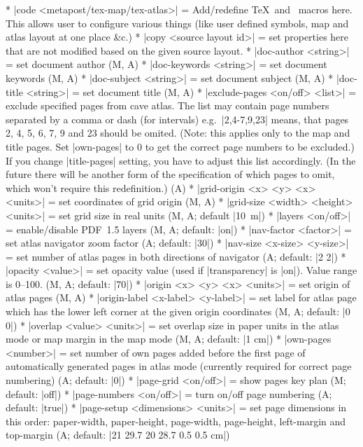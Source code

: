 \comopt 
  * |code <metapost/tex-map/tex-atlas>| = Add/redefine \TeX\ and \MP\
    macros here. This allows user to configure various things 
    (like user defined symbols, map and atlas layout at one place \&c.)
  * |copy <source layout id>| = set properties here that are not
    modified based on the given source layout.
  * |doc-author <string>| = set document author (M, A)
  * |doc-keywords <string>| = set document keywords (M, A)
  * |doc-subject <string>| = set document subject (M, A)
  * |doc-title <string>| = set document title (M, A)
  * |exclude-pages <on/off> <list>| = exclude specified pages from cave
    atlas. The list may contain page numbers separated by a comma or dash (for intervals) 
    e.g.~|2,4-7,9,23| means, that pages 2, 4, 5, 6, 7, 9 and 23 should be 
    omited. (Note: this applies only to the map and title pages. Set 
    |own-pages| to 0 to get the correct page numbers to be excluded.) 
    If you change |title-pages| setting, you have to
    adjust this list accordingly. (In the future there will be another form
    of the specification of which pages to omit, which won't require
    this redefinition.) (A)
  * |grid-origin <x> <y> <x> <units>| = set coordinates of grid
    origin (M, A)
  * |grid-size <width> <height> <units>| = set grid size in real
    units (M, A; default \hbox{|10 m|})
  * |layers <on/off>| = enable/disable PDF~1.5 layers (M, A; default: |on|)
  * |nav-factor <factor>| = set atlas navigator zoom factor (A; default: |30|)
  * |nav-size <x-size> <y-size>| = set number of atlas pages in 
    both directions of navigator (A; default: |2 2|)
  * |opacity <value>| = set opacity value (used if |transparency| is |on|). 
    Value range is 0--100. (M, A; default: |70|)
  * |origin <x> <y> <x> <units>| = set origin of atlas pages (M, A)
  * |origin-label <x-label> <y-label>| = set label for atlas page
    which has the lower left corner at the given origin coordinates
    (M, A; default: |0 0|)
  * |overlap <value> <units>| = set overlap size in paper units in the atlas 
    mode or map margin in the map mode (M, A; default: |1 cm|)
  * |own-pages <number>| = set number of own pages added before 
    the first page of automatically generated pages in atlas mode
    (currently required for correct page numbering) (A; default: |0|)
  * |page-grid <on/off>| = show pages key plan (M; default: |off|)
  * |page-numbers <on/off>| = turn on/off page numbering (A; default: |true|)
  * |page-setup <dimensions> <units>| = set page dimensions in
    this order: paper-width, paper-height, page-width, page-height,
    left-margin and top-margin (A; default: |21 29.7 20 28.7 0.5 0.5 cm|)
